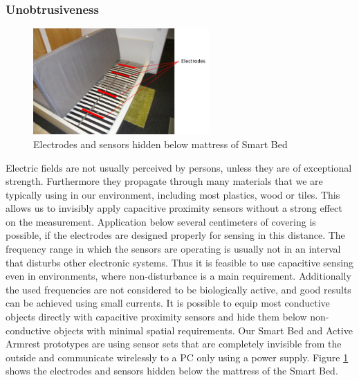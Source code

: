 \subsubsection{Unobtrusiveness}
 \begin{figure}[h]
\centering
\includegraphics[width=0.6\textwidth]{images/disc_unob_bed.png}
\caption{Electrodes and sensors hidden below mattress of Smart Bed}
\label{fig:disc_unob_elec}
\end{figure}
Electric fields are not usually perceived by persons, unless they are of exceptional strength. Furthermore they propagate through many materials that we are typically using in our environment, including most plastics, wood or tiles. This allows us to invisibly apply capacitive proximity sensors without a strong effect on the measurement. Application below several centimeters of covering is possible, if the electrodes are designed properly for sensing in this distance.
The frequency range in which the sensors are operating is usually not in an interval that disturbs other electronic systems. Thus it is feasible to use capacitive sensing even in environments, where non-disturbance is a main requirement.  Additionally the used frequencies are not considered to be biologically active, and good results can be achieved using small currents. 
It is possible to equip most conductive objects directly with capacitive proximity sensors and hide them below non-conductive objects with minimal spatial requirements. Our Smart Bed and Active Armrest prototypes are using sensor sets that are completely invisible from the outside and communicate wirelessly to a PC only using a power supply. Figure \ref{fig:disc_unob_elec} shows the electrodes and sensors hidden below the mattress of the Smart Bed.
